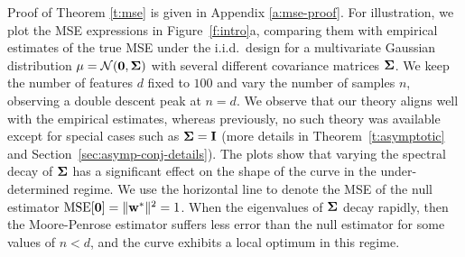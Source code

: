 \documentclass[11pt]{article}
\begin{document}
\noindent
Proof of Theorem \ref{t:mse} is given in Appendix \ref{a:mse-proof}.
For illustration, we plot the MSE expressions in Figure~\ref{f:intro}a,
comparing them with empirical estimates of the true MSE under the
i.i.d.~design for a multivariate Gaussian distribution
$\mu=\mathcal{N}(\mathbf 0,\mathbf{\Sigma})$ with several different covariance matrices $\mathbf{\Sigma}$. We keep the number of features $d$ fixed to
$100$ and vary the number of samples $n$, observing a double descent
peak at $n=d$. We observe that our theory aligns well with
the empirical estimates, whereas
previously, no such theory was available except for special
cases such as $\mathbf{\Sigma}=\mathbf I$ (more details in Theorem~\ref{t:asymptotic}
and Section~\ref{sec:asymp-conj-details}). The plots
show that varying the spectral decay of $\mathbf{\Sigma}$ has a significant effect on the
shape of the curve in the under-determined regime. We use the
horizontal line to denote the MSE of the null estimator
$\mathrm{MSE}[\mathbf 0]=\|\mathbf w^*\|^2=1$. When the eigenvalues of $\mathbf{\Sigma}$
decay rapidly, then the Moore-Penrose estimator suffers less error
than the null estimator for some values of $n<d$, and the curve
exhibits a local optimum in this regime.
\end{document}
